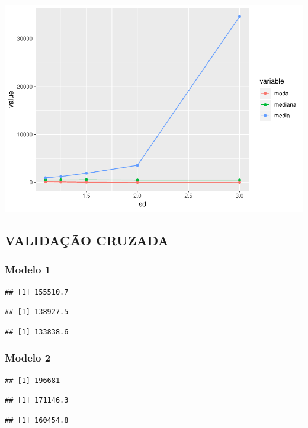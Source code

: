 \documentclass[]{article}
\begin{document}
\includegraphics{Impacto_sigma_files/figure-latex/unnamed-chunk-36-1.pdf}

\subsection{VALIDAÇÃO CRUZADA}\label{validacao-cruzada}

\subsubsection{Modelo 1}\label{modelo-1}

\begin{verbatim}
## [1] 155510.7
\end{verbatim}

\begin{verbatim}
## [1] 138927.5
\end{verbatim}

\begin{verbatim}
## [1] 133838.6
\end{verbatim}

\subsubsection{Modelo 2}\label{modelo-2}

\begin{verbatim}
## [1] 196681
\end{verbatim}

\begin{verbatim}
## [1] 171146.3
\end{verbatim}

\begin{verbatim}
## [1] 160454.8
\end{verbatim}
\end{document}
